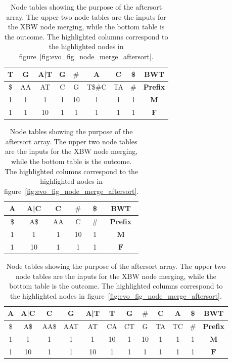 \documentclass[a4paper,12pt,twoside,BCOR=10mm]{scrbook}
\begin{document}
\begin{table}[htb]
\centering
\caption[Node tables showing purpose of aftersort array]{Node tables showing the purpose of the aftersort array. The upper two node tables are the inputs for the XBW node merging, while the bottom table is the outcome. The highlighted columns correspond to the highlighted nodes in figure~\ref{fig:evo_fig_node_merge_aftersort}.}

{
\renewcommand{\tabcolsep}{4pt}
\begin{tabular}{ | c | c | c | c | c | c | c | c | c | }
\hline
T & G & A|T & G & $\#$ &\cellcolor{green_bg}\color{green_fx}A &\cellcolor{purple_bg}\color{purple_fx}C & \$ & \textbf{BWT} \\ \hline 
\$ & AA & AT & C & G &\cellcolor{green_bg}\color{green_fx}T\$$\#$C &\cellcolor{purple_bg}\color{purple_fx}TA & $\#$ & \textbf{Prefix} \\ \hline 
1 & 1 & 1 & 1 & 10 &\cellcolor{green_bg}\color{green_fx}1 &\cellcolor{purple_bg}\color{purple_fx}1 & 1 & $\boldsymbol{M}$ \\ \hline 
1 & 1 & 10 & 1 & 1 &\cellcolor{green_bg}\color{green_fx}1 &\cellcolor{purple_bg}\color{purple_fx}1 & 1 & $\boldsymbol{F}$ \\ \hline 
\end{tabular}
\quad
\begin{tabular}{ | c | c | c | c | c | c | }
\hline
A & A|C & C & $\#$ & \$ & \textbf{BWT} \\ \hline 
\$ & A\$ & AA & C & $\#$ & \textbf{Prefix} \\ \hline 
1 & 1 & 1 & 10 & 1 & $\boldsymbol{M}$ \\ \hline 
1 & 10 & 1 & 1 & 1 & $\boldsymbol{F}$ \\ \hline 
\end{tabular}
}

\vspace{0.5cm}

\begin{tabular}{ | c | c | c | c | c | c | c | c | c | c | c | c | }
\hline
A & A|C & C & G & A|T & T & G & $\#$ &\cellcolor{purple_bg}\color{purple_fx}C &\cellcolor{green_bg}\color{green_fx}A & \$ & \textbf{BWT} \\ \hline 
\$ & A\$ & AA\$ & AAT & AT & CA & CT & G &\cellcolor{purple_bg}\color{purple_fx}TA &\cellcolor{green_bg}\color{green_fx}TC & $\#$ & \textbf{Prefix} \\ \hline 
1 & 1 & 1 & 1 & 1 & 10 & 1 & 10 &\cellcolor{purple_bg}\color{purple_fx}1 &\cellcolor{green_bg}\color{green_fx}1 & 1 & $\boldsymbol{M}$ \\ \hline 
1 & 10 & 1 & 1 & 10 & 1 & 1 & 1 &\cellcolor{purple_bg}\color{purple_fx}1 &\cellcolor{green_bg}\color{green_fx}1 & 1 & $\boldsymbol{F}$ \\ \hline 
\end{tabular}

\label{table:node_merge_aftersort}
\end{table}
\end{document}
